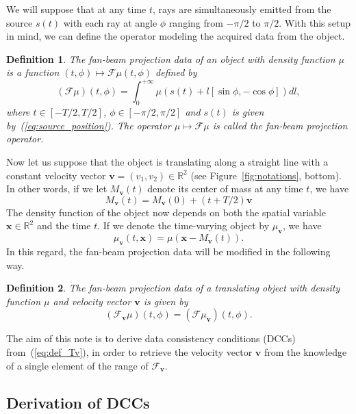 \documentclass[letterpaper,twocolumn]{IEEEtran}
\newcommand{\R}{\mathbb{R}}
\newcommand{\bx}{\mathbf{x}}
\newcommand{\bv}{\mathbf{v}}
\newcommand{\Mbv}{M_{\mathbf{v}}}
\newcommand{\Tbv}{\mathcal{F}_{\mathbf{v}}}
\newcommand{\mubv}{\mu_{\mathbf{v}}}
\newtheorem{definition}{Definition}
\begin{document}
We will suppose that at any time $t$, rays are simultaneously emitted from the source $s(t)$ with each ray at angle $\phi$ ranging from $-\pi/2$ to $\pi/2$. With this setup in mind, we can define the operator modeling the acquired data from the object.
\begin{definition}
The \emph{fan-beam projection data} of an object with density function $\mu$ is a function $(t,\phi) \mapsto \mathcal{F}\mu(t,\phi)$ defined by
\begin{equation}
	(\mathcal{F}\mu)(t,\phi) = \int_0^{+\infty} \mu \left( s(t) + l \left[ \sin \phi, -\cos \phi \right] \right) dl,
\end{equation}
where $t \in \left[ -T/2, T/2\right]$, $\phi \in \left[ -\pi/2, \pi/2\right]$ and $s(t)$ is given by~(\ref{eq:source_position}). The operator $\mu \mapsto \mathcal{F}\mu$ is called the \emph{fan-beam projection operator}.
\end{definition}


Now let us suppose that the object is translating along a straight line with a constant velocity vector $\bv = (v_1, v_2)\in \R^2$ (see Figure~\ref{fig:notations}, bottom). In other words, if we let $\Mbv(t)$ denote its center of mass at any time $t$, we have
\begin{equation}
	\Mbv(t) =   \Mbv(0) + \left( t + T/2 \right) \bv
\label{eq:center_of_mass}
\end{equation}
The density function of the object now depends on both the spatial variable $\bx \in \R^2$ and the time $t$. If we denote the time-varying object by $\mubv$, we have
\begin{equation}
	\mubv(t,\bx) = \mu\left( \bx - \Mbv(t)\right).
\end{equation}
In this regard, the fan-beam projection data will be modified in the following way.
\begin{definition}
The \emph{fan-beam projection data of a translating object} with density function $\mu$ and  velocity vector $\bv$ is given by
\begin{equation}
	(\Tbv\mu)(t,\phi) =  ( \mathcal{F} \mubv ) (t,\phi).
\label{eq:def_Tv}
\end{equation}
\end{definition}

The aim of this note is to derive data consistency conditions (DCCs) from~(\ref{eq:def_Tv}), in order to retrieve the velocity vector $\bv$ from the knowledge of a single element of the range of $\Tbv$.

\subsection{Derivation of DCCs}
\end{document}
